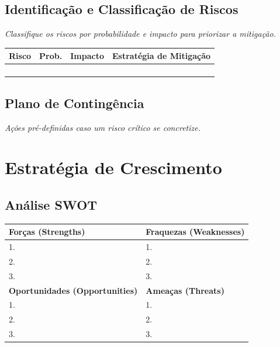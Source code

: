 \documentclass[
	12pt,
	openright,
	oneside,
	a4paper,
	chapter=TITLE,
	section=TITLE,
	english,
	brazil
	]{abntex2}
\newcommand{\tcampo}[1]{%
	{#1}%
}
\newcommand{\instrucao}[1]{%
	\vspace{0.3cm}%
	\noindent%
	{%
		\setlength{\fboxsep}{6pt}%
		\colorbox{azul-claro}{%
			\begin{minipage}{\dimexpr\textwidth-2\fboxsep\relax}%
				\setlength{\parindent}{1.25cm}%
				{\color{cinza-instrucao}\small\itshape #1}%
			\end{minipage}%
		}%
	}%
	\vspace{0.3cm}%
}
\begin{document}
\section{Identificação e Classificação de Riscos}

\instrucao{Classifique os riscos por probabilidade e impacto para priorizar a mitigação.}

\centering
\begin{tabularx}{\textwidth}{X c c X}
\toprule
\rowcolor{azul-claro}
\textbf{Risco} & \textbf{Prob.} & \textbf{Impacto} & \textbf{Estratégia de Mitigação} \\
\midrule
\tcampo{} & \tcampo{} & \tcampo{} & \tcampo{} \\
\tcampo{} & \tcampo{} & \tcampo{} & \tcampo{} \\
\tcampo{} & \tcampo{} & \tcampo{} & \tcampo{} \\
\tcampo{} & \tcampo{} & \tcampo{} & \tcampo{} \\
\bottomrule
\end{tabularx}

\section{Plano de Contingência}

\instrucao{Ações pré-definidas caso um risco crítico se concretize.}

\clearpage

\chapter{Estratégia de Crescimento}

\section{Análise SWOT}

\centering
\begin{tabularx}{\textwidth}{X X}
\toprule
\rowcolor{azul-claro}
\textbf{Forças (Strengths)} & \textbf{Fraquezas (Weaknesses)} \\
\midrule
1. \tcampo{} & 1. \tcampo{} \\
2. \tcampo{} & 2. \tcampo{} \\
3. \tcampo{} & 3. \tcampo{} \\
\addlinespace
\rowcolor{azul-claro}
\textbf{Oportunidades (Opportunities)} & \textbf{Ameaças (Threats)} \\
\midrule
1. \tcampo{} & 1. \tcampo{} \\
2. \tcampo{} & 2. \tcampo{} \\
3. \tcampo{} & 3. \tcampo{} \\
\bottomrule
\end{tabularx}
\end{document}
